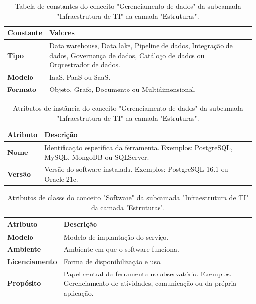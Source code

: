 \begin{apendicesenv}
\begin{table}[H]
\centering
\caption{Tabela de constantes do conceito "Gerenciamento de dados" da subcamada "Infraestrutura de TI" da camada "Estruturas".}
\begin{tabularx}{\textwidth}{|l|X|X|}
\hline
\textbf{Constante} & \textbf{Valores} \\ \hline
\textbf{Tipo} & Data warehouse, Data lake, Pipeline de dados, Integração de dados, Governança de dados, Catálogo de dados ou Orquestrador de dados.\\ \hline
\textbf{Modelo} & IaaS, PaaS ou SaaS. \\ \hline
\textbf{Formato} & Objeto, Grafo, Documento ou Multidimensional. \\ \hline
\end{tabularx}
\end{table}

\begin{table}[H]
\centering
\caption{Atributos de instância do conceito "Gerenciamento de dados" da subcamada "Infraestrutura de TI" da camada "Estruturas".}
\begin{tabularx}{\textwidth}{|l|X|X|}
\hline
\textbf{Atributo} & \textbf{Descrição} \\ \hline
\textbf{Nome} & Identificação específica da ferramenta. Exemplos: PostgreSQL, MySQL, MongoDB ou SQLServer. \\ \hline
\textbf{Versão} & Versão do software instalada. Exemplos: PostgreSQL 16.1 ou Oracle 21c. \\ \hline
\end{tabularx}
\end{table}

\begin{table}[H]
\centering
\caption{Atributos de classe do conceito "Software" da subcamada "Infraestrutura de TI" da camada "Estruturas".}
\begin{tabularx}{\textwidth}{|l|X|X|}
\hline
\textbf{Atributo} & \textbf{Descrição} \\ \hline
\textbf{Modelo} & Modelo de implantação do serviço. \\ \hline
\textbf{Ambiente} & Ambiente em que o software funciona. \\ \hline
\textbf{Licenciamento} & Forma de disponibilização e uso. \\ \hline
\textbf{Propósito} & Papel central da ferramenta no observatório. Exemplos: Gerenciamento de atividades, comunicação ou da própria aplicação. \\ \hline
\end{tabularx}
\end{table}


\end{apendicesenv}
